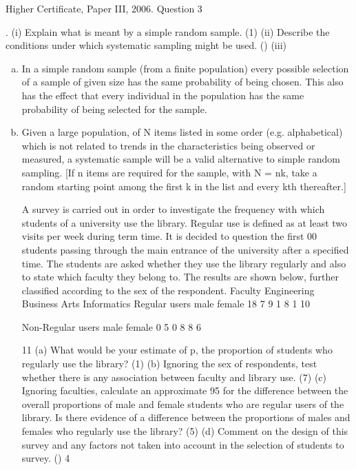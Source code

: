 \documentclass[a4paper,12pt]{article}
\begin{document}
Higher Certificate, Paper III, 2006. Question 3
\begin{framed}
.
(i)
Explain what is meant by a simple random sample.
(1)
(ii)
Describe the conditions under which systematic sampling might be used.
()
(iii)

\end{framed}
\begin{enumerate}[(a)]
\item In a simple random sample (from a finite population) every possible selection of a sample of given size has the same probability of being chosen. This also has the effect that every individual in the population has the same probability of being selected for the sample.
\item Given a large population, of N items listed in some order (e.g. alphabetical) which is not related to trends in the characteristics being observed or measured, a systematic sample will be a valid alternative to simple random sampling. [If n items are required for the sample, with N = nk, take a random starting point among the first k in the list and every kth thereafter.]


\newpage
\begin{framed}
A survey is carried out in order to investigate the frequency with which
students of a university use the library. Regular use is defined as at least two
visits per week during term time.
It is decided to question the first 00 students passing through the main
entrance of the university after a specified time. The students are asked
whether they use the library regularly and also to state which faculty they
belong to. The results are shown below, further classified according to the sex
of the respondent.
Faculty
Engineering
Business
Arts
Informatics
Regular users
male
female
18
7
9
1
8
1
10

Non-Regular users
male
female
0
5
0
8
8
6

11
(a) What would be your estimate of p, the proportion of students who
regularly use the library?
(1)
(b) Ignoring the sex of respondents, test whether there is any association
between faculty and library use.
(7)
(c) Ignoring faculties, calculate an approximate 95%
for the difference between the overall proportions of male and female
students who are regular users of the library. Is there evidence of a
difference between the proportions of males and females who regularly
use the library?
(5)
(d) Comment on the design of this survey and any factors not taken into
account in the selection of students to survey.
()
4
\end{framed}


\end{enumerate}
\end{document}
